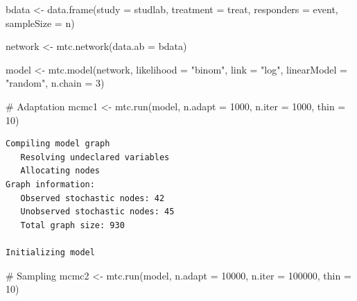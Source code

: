 \documentclass[
  letterpaper,
  DIV=11,
  numbers=noendperiod]{scrreprt}
\newenvironment{Shaded}{\begin{snugshade}}{\end{snugshade}}
\newcommand{\AttributeTok}[1]{\textcolor[rgb]{0.40,0.45,0.13}{#1}}
\newcommand{\CommentTok}[1]{\textcolor[rgb]{0.37,0.37,0.37}{#1}}
\newcommand{\DecValTok}[1]{\textcolor[rgb]{0.68,0.00,0.00}{#1}}
\newcommand{\FunctionTok}[1]{\textcolor[rgb]{0.28,0.35,0.67}{#1}}
\newcommand{\NormalTok}[1]{\textcolor[rgb]{0.00,0.23,0.31}{#1}}
\newcommand{\OtherTok}[1]{\textcolor[rgb]{0.00,0.23,0.31}{#1}}
\newcommand{\StringTok}[1]{\textcolor[rgb]{0.13,0.47,0.30}{#1}}
\begin{document}
\begin{Shaded}
\begin{Highlighting}[]
\NormalTok{bdata }\OtherTok{\textless{}{-}} \FunctionTok{data.frame}\NormalTok{(}\AttributeTok{study =}\NormalTok{ studlab,}
                    \AttributeTok{treatment =}\NormalTok{ treat,}
                    \AttributeTok{responders =}\NormalTok{ event,}
                    \AttributeTok{sampleSize =}\NormalTok{ n)}

\NormalTok{network }\OtherTok{\textless{}{-}} \FunctionTok{mtc.network}\NormalTok{(}\AttributeTok{data.ab  =}\NormalTok{ bdata)}

\NormalTok{model }\OtherTok{\textless{}{-}} \FunctionTok{mtc.model}\NormalTok{(network,}
                   \AttributeTok{likelihood =} \StringTok{"binom"}\NormalTok{,}
                   \AttributeTok{link =} \StringTok{"log"}\NormalTok{,}
                   \AttributeTok{linearModel =} \StringTok{"random"}\NormalTok{,}
                   \AttributeTok{n.chain =} \DecValTok{3}\NormalTok{)}
\end{Highlighting}
\end{Shaded}

\begin{Shaded}
\begin{Highlighting}[]
\CommentTok{\# Adaptation}
\NormalTok{mcmc1 }\OtherTok{\textless{}{-}} \FunctionTok{mtc.run}\NormalTok{(model, }\AttributeTok{n.adapt =} \DecValTok{1000}\NormalTok{, }\AttributeTok{n.iter =} \DecValTok{1000}\NormalTok{, }\AttributeTok{thin =} \DecValTok{10}\NormalTok{)}
\end{Highlighting}
\end{Shaded}

\begin{verbatim}
Compiling model graph
   Resolving undeclared variables
   Allocating nodes
Graph information:
   Observed stochastic nodes: 42
   Unobserved stochastic nodes: 45
   Total graph size: 930

Initializing model
\end{verbatim}

\begin{Shaded}
\begin{Highlighting}[]
\CommentTok{\# Sampling}
\NormalTok{mcmc2 }\OtherTok{\textless{}{-}} \FunctionTok{mtc.run}\NormalTok{(model, }\AttributeTok{n.adapt =} \DecValTok{10000}\NormalTok{, }\AttributeTok{n.iter =} \DecValTok{100000}\NormalTok{, }\AttributeTok{thin =} \DecValTok{10}\NormalTok{)}
\end{Highlighting}
\end{Shaded}
\end{document}
